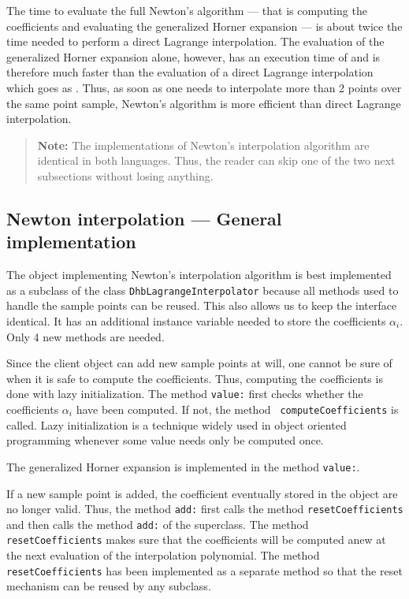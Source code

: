 \documentclass[twoside]{book}
\begin{document}
The time to evaluate the full Newton's algorithm --- that is
computing the coefficients and evaluating the generalized Horner
expansion --- is about twice the time needed to perform a direct
Lagrange interpolation. The evaluation of the generalized Horner
expansion alone, however, has an execution time of  and
is therefore much faster than the evaluation of a direct Lagrange
interpolation which goes as . Thus, as soon as one needs
to interpolate more than 2 points over the same point sample,
Newton's algorithm is more efficient than direct Lagrange
interpolation.
\begin{quote}
{\bf Note:} The implementations of Newton's interpolation
algorithm are identical in both languages. Thus, the reader can
skip one of the two next subsections without losing anything.
\end{quote}


\subsection{Newton interpolation --- General implementation}
 The object implementing Newton's
interpolation algorithm is best implemented as a subclass of the
class {\tt DhbLagrangeInterpolator} because all methods used to
handle the sample points can be reused. This also allows us to
keep the interface identical. It has an additional instance
variable needed to store the coefficients $\alpha_i$. Only 4 new
methods are needed.

Since the client object can add new sample points at will, one
cannot be sure of when it is safe to compute the coefficients.
Thus, computing the coefficients is done with lazy initialization.
The method {\tt value:} first checks whether the coefficients
$\alpha_i$ have been computed. If not, the method {\tt
computeCoefficients} is called. Lazy initialization is a technique
widely used in object oriented programming whenever some value
needs only be computed once.

\noindent The generalized Horner expansion is implemented in the
method {\tt value:}.

If a new sample point is added, the coefficient eventually stored
in the object are no longer valid. Thus, the method {\tt add:}
first calls the method {\tt resetCoefficients} and then calls the
method {\tt add:} of the superclass. The method {\tt
resetCoefficients} makes sure that the coefficients will be
computed anew at the next evaluation of the interpolation
polynomial. The method {\tt resetCoefficients} has been
implemented as a separate method so that the reset mechanism can
be reused by any subclass.
\end{document}
